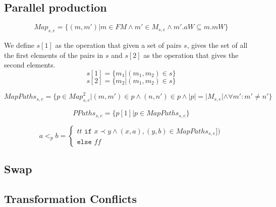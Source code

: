 \subsection{Parallel production}

\[Map_{s, e} = \{(m, m')| m \in FM \land m' \in M_{s,e} \land m'.aW \subseteq m.mW\} \]

We define $s[1]$ as the operation that given a set of pairs $s$, gives the set of all the first elements of the pairs in $s$ and $s[2]$ as the operation that gives the second elements.
\[s[1] = \{m_1 | (m_1, m_2) \in s\}\]
\[s[2] = \{m_2 | (m_1, m_2) \in s\}\]

\[MapPaths_{s,e} = \{p \in {Map}_{s,e}^2 | (m,m') \in p \land (n,n') \in p \land |p| = |M_{s,e}| \land  \forall m': m' \neq n' \}\]

\[ PPaths_{s,e} = \{p[1] | p \in MapPaths_{s,e}\}\]

\[a <_{p} b = 
\left\{\begin{matrix}
tt \texttt{ if } x \prec y \land (x, a), (y, b) \in MapPaths_{s,e}])\\
\texttt{else } ff
\end{matrix}\right.\]



\subsection{Swap}


\subsection{Transformation Conflicts}\label{ssec:tc} 

